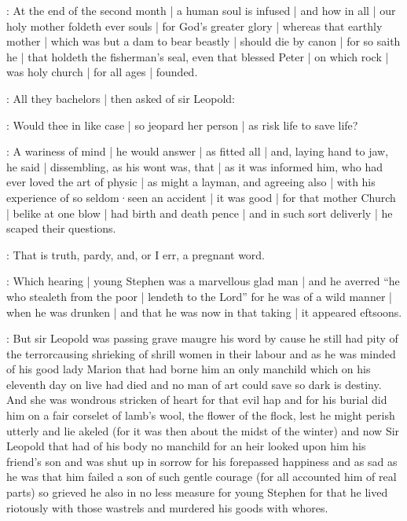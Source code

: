 \stephen:
At the end of the second month |
a human soul is infused |
and how in all |
our holy mother foldeth ever souls |
for God's greater glory |
whereas that earthly mother |
which was but a dam to bear beastly |
should die by canon |
for so saith he |
that holdeth the fisherman's seal,
even that blessed Peter |
on which rock |
was holy church |
for all ages |
founded.

:
All they bachelors |
then asked of sir Leopold:

\All:
Would thee in like case |
so jeopard her person |
as risk life to save life?

:
A wariness of mind |
he would answer |
as fitted all |
and,
laying hand to jaw,
he said |
dissembling,
as his wont was,
that |
as it was informed him,
who had ever loved the art of physic |
as might a layman,
and agreeing also |
with his experience of so seldom·seen an accident |
it was good |
for that mother Church |
belike at one blow |
had birth and death pence |
and in such sort deliverly |
he scaped their questions.

\dixon:
That is truth,
pardy,
and,
or I err,
a pregnant word.

:
Which hearing |
young Stephen was a marvellous glad man |
and he averred
“he who stealeth from the poor |
lendeth to the Lord”
for he was of a wild manner |
when he was drunken |
and that he was now in that taking |
it appeared eftsoons.


:
But sir Leopold was passing grave maugre his word by cause he still
had pity of the terrorcausing shrieking of shrill women in their labour
and as he was minded of his good lady Marion that had borne him an only
manchild which on his eleventh day on live had died and no man of art
could save so dark is destiny.
And she was wondrous stricken of heart for
that evil hap and for his burial did him on a fair corselet of lamb's
wool,
the flower of the flock,
lest he might perish utterly and lie
akeled
(for it was then about the midst of the winter)
and now Sir Leopold that had of his body no manchild for an heir looked upon him his
friend's son and was shut up in sorrow for his forepassed happiness and
as sad as he was that him failed a son of such gentle courage
(for all accounted him of real parts)
so grieved he also in no less measure for
young Stephen for that he lived riotously with those wastrels and
murdered his goods with whores.



